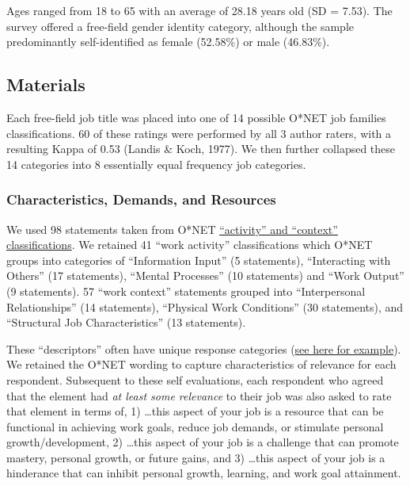\documentclass[
  english,
  man]{apa6}
\begin{document}
Ages ranged from 18 to 65 with an average of 28.18 years old (SD = 7.53). The survey offered a free-field gender identity category, although the sample predominantly self-identified as female (52.58\%) or male (46.83\%).

\hypertarget{materials}{%
\subsection{Materials}\label{materials}}

Each free-field job title was placed into one of 14 possible O*NET job families classifications. 60 of these ratings were performed by all 3 author raters, with a resulting Kappa of 0.53 (Landis \& Koch, 1977). We then further collapsed these 14 categories into 8 essentially equal frequency job categories.

\hypertarget{characteristics-demands-and-resources}{%
\subsubsection{Characteristics, Demands, and Resources}\label{characteristics-demands-and-resources}}

We used 98 statements taken from O*NET \href{https://www.O*NETonline.org/find/descriptor/result/4.A.1.b.3}{``activity'' and ``context'' classifications}. We retained 41 ``work activity'' classifications which O*NET groups into categories of ``Information Input'' (5 statements), ``Interacting with Others'' (17 statements), ``Mental Processes'' (10 statements) and ``Work Output'' (9 statements). 57 ``work context'' statements grouped into ``Interpersonal Relationships'' (14 statements), ``Physical Work Conditions'' (30 statements), and ``Structural Job Characteristics'' (13 statements).

These ``descriptors'' often have unique response categories (\href{https://www.O*NETonline.org/find/descriptor/result/4.C.1.c.2}{see here for example}). We retained the O*NET wording to capture characteristics of relevance for each respondent. Subsequent to these self evaluations, each respondent who agreed that the element had \emph{at least some relevance} to their job was also asked to rate that element in terms of, 1) \ldots this aspect of your job is a resource that can be functional in achieving work goals, reduce job demands, or stimulate personal growth/development, 2) \ldots this aspect of your job is a challenge that can promote mastery, personal growth, or future gains, and 3) \ldots this aspect of your job is a hinderance that can inhibit personal growth, learning, and work goal attainment.
\end{document}
